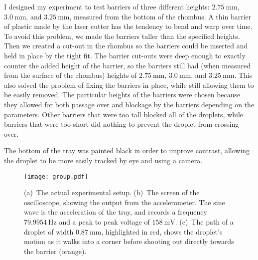 I designed my experiment to test barriers of three different heights: $2.75~\mathrm{mm}$, $3.0~\mathrm{mm}$, and $3.25~\mathrm{mm}$, measured from the bottom of the rhombus. A thin barrier of plastic made by the laser cutter has the tendency to bend and warp over time. To avoid this problem, we made the barriers taller than the specified heights. Then we created a cut-out in the rhombus so the barriers could be inserted and held in place by the tight fit. The barrier cut-outs were deep enough to exactly counter the added height of the barrier, so the barriers still had (when measured from the surface of the rhombus) heights of $2.75~\mathrm{mm}$, $3.0~\mathrm{mm}$, and $3.25~\mathrm{mm}$. This also solved the problem of fixing the barriers in place, while still allowing them to be easily removed. The particular heights of the barriers were chosen because they allowed for both passage over and blockage by the barriers depending on the parameters. Other barriers that were too tall blocked all of the droplets, while barriers that were too short did nothing to prevent the droplet from crossing over.

The bottom of the tray was painted black in order to improve contrast, allowing the droplet to be more easily tracked by eye and using a camera.

\begin{figure}[h!]
	\centering
	\texttt{[image: group.pdf]}
	\caption{(a)~The actual experimental setup. 
	(b)~The screen of the oscilloscope, showing the output from the accelerometer. The sine wave is the acceleration of the tray, and records a frequency $79.9954~\mathrm{Hz}$ and a peak to peak voltage of $158~\mathrm{mV}$. 
	(c)~The path of a droplet of width $0.87~\mathrm{mm}$, highlighted in red, shows the droplet's motion as it walks into a corner before shooting out directly towards the barrier (orange).}
	\label{group}
\end{figure}

